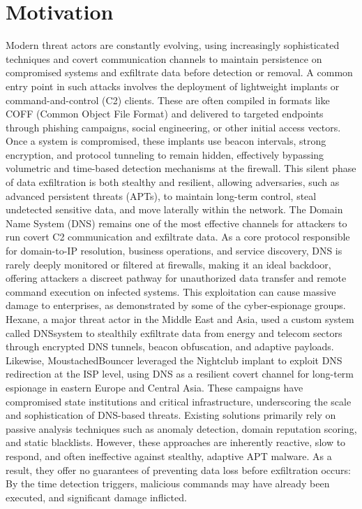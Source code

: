 \documentclass [11pt, proquest] {uwthesis}[2020/02/24]
\begin{document}
\section{Motivation}
Modern threat actors are constantly evolving, using increasingly sophisticated techniques and covert communication channels to maintain persistence on compromised systems and exfiltrate data before detection or removal. A common entry point in such attacks involves the deployment of lightweight implants or command-and-control (C2) clients. These are often compiled in formats like COFF (Common Object File Format) and delivered to targeted endpoints through phishing campaigns, social engineering, or other initial access vectors.
Once a system is compromised, these implants use beacon intervals, strong encryption, and protocol tunneling to remain hidden, effectively bypassing volumetric and time-based detection mechanisms at the firewall. This silent phase of data exfiltration is both stealthy and resilient, allowing adversaries, such as advanced persistent threats (APTs), to maintain long-term control, steal undetected sensitive data, and move laterally within the network.
The Domain Name System (DNS) remains one of the most effective channels for attackers to run covert C2 communication and exfiltrate data. As a core protocol responsible for domain-to-IP resolution, business operations, and service discovery, DNS is rarely deeply monitored or filtered at firewalls, making it an ideal backdoor, offering attackers a discreet pathway for unauthorized data transfer and remote command execution on infected systems. 
This exploitation can cause massive damage to enterprises, as demonstrated by some of the cyber-espionage groups. Hexane, a major threat actor in the Middle East and Asia, used a custom system called DNSsystem to stealthily exfiltrate data from energy and telecom sectors through encrypted DNS tunnels, beacon obfuscation, and adaptive payloads. Likewise, MoustachedBouncer leveraged the Nightclub implant to exploit DNS redirection at the ISP level, using DNS as a resilient covert channel for long-term espionage in eastern Europe and Central Asia. These campaigns have compromised state institutions and critical infrastructure, underscoring the scale and sophistication of DNS-based threats.
Existing solutions primarily rely on passive analysis techniques such as anomaly detection, domain reputation scoring, and static blacklists. However, these approaches are inherently reactive, slow to respond, and often ineffective against stealthy, adaptive APT malware. As a result, they offer no guarantees of preventing data loss before exfiltration occurs: By the time detection triggers, malicious commands may have already been executed, and significant damage inflicted.
\end{document}
